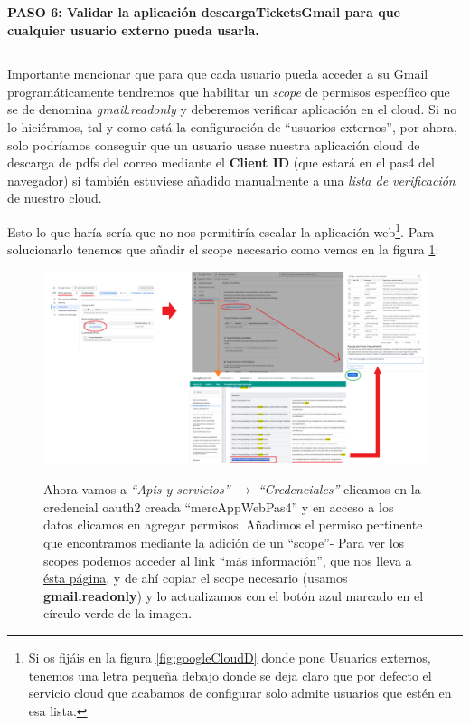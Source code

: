 \documentclass[a4paper,12pt]{report}
\begin{document}
	
	
	
	\noindent \textbf{PASO 6: Validar la aplicación descargaTicketsGmail para que cualquier usuario externo pueda usarla.}
	\vspace{.1em}
	\hrule
	\vspace{.5em}
	
	
	Importante mencionar que para que cada usuario pueda acceder a su Gmail programáticamente tendremos que habilitar un \textit{scope} de permisos específico que se de denomina \textit{gmail.readonly} y deberemos verificar aplicación en el cloud. Si no lo hiciéramos, tal y como está la configuración de ``usuarios externos'', por ahora, solo podríamos conseguir que un usuario usase nuestra aplicación cloud de descarga de pdfs del correo mediante el \textbf{Client ID} (que estará en el pas4 del navegador) si también estuviese añadido manualmente a una \textit{lista de verificación} de nuestro cloud.
	
	Esto lo que haría sería que no nos permitiría escalar la aplicación web\footnote{Si os fijáis en la figura \ref{fig:googleCloudD} donde pone Usuarios externos, tenemos una letra pequeña debajo donde se deja claro que por defecto el servicio cloud que acabamos de configurar solo admite usuarios que estén en esa lista.}. Para solucionarlo tenemos que añadir el scope necesario como vemos en la figura \ref{fig:googleCloudG}:
	
	\FloatBarrier
	\setlength{\belowcaptionskip}{3pt}
	\begin{figure}[H]
		\centering
		\caption{Ahora vamos a \textit{``Apis y servicios''} $\rightarrow$ \textit{``Credenciales''} clicamos en la credencial oauth2 creada ``mercAppWebPas4'' y en acceso a los datos clicamos en agregar permisos. Añadimos el permiso pertinente que encontramos mediante la adición de un ``scope''- Para ver los scopes podemos acceder al link ``más información'', que nos lleva a \href{https://developers.google.com/identity/protocols/oauth2/scopes?hl=es_419}{ésta página}, y de ahí copiar el scope necesario (usamos \textbf{gmail.readonly}) y lo actualizamos con el botón azul marcado en el círculo verde de la imagen.}
		\includegraphics[width=1\linewidth]{img/googleCloudG}
		\label{fig:googleCloudG}
	\end{figure}
	\FloatBarrier
	
\end{document}
